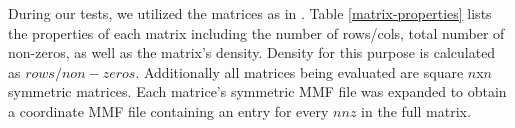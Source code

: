 During our tests, we utilized the matrices as in \cite{techbib:6933066}. Table \ref{matrix-properties} lists the properties of each matrix including the number of rows/cols, total number of non-zeros, as well as the matrix's density. Density for this purpose is calculated as $rows / non-zeros$. Additionally all matrices being evaluated are square $n$x$n$ symmetric matrices.
Each matrice's symmetric MMF file was expanded to obtain a coordinate MMF file containing an entry for every $nnz$ in the full matrix.  


%	
%
%
%
%
%	
